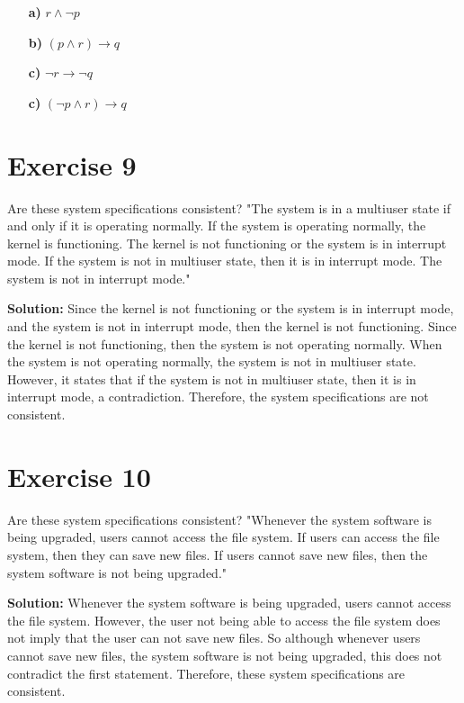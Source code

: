 \documentclass{Axon}
\begin{document}
\noindent
\begin{enumerate}
    \item[\textbf{a)}] \(r \land \lnot p\)
    \item[\textbf{b)}] \((p \land r) \to q\)
    \item[\textbf{c)}] \(\lnot r \to \lnot q\)
    \item[\textbf{c)}] \((\lnot p \land r) \to q\)
\end{enumerate}

\section*{Exercise 9}
Are these system specifications consistent? "The system is in a multiuser state if and only if it is operating normally. If the system is operating normally, the kernel is functioning. The kernel is not functioning or the system is in interrupt mode. If the system is not in multiuser state, then it is in interrupt mode. The system is not in interrupt mode."

\noindent
\textbf{Solution:}
Since the kernel is not functioning or the system is in interrupt mode, and the system is not in interrupt mode, then the kernel is not functioning. Since the kernel is not functioning, then the system is not operating normally. When the system is not operating normally, the system is not in multiuser state. However, it states that if the system is not in multiuser state, then it is in interrupt mode, a contradiction. Therefore, the system specifications are not consistent.

\section*{Exercise 10}
Are these system specifications consistent? "Whenever the system software is being upgraded, users cannot access the file system. If users can access the file system, then they can save new files. If users cannot save new files, then the system software is not being upgraded."

\noindent
\textbf{Solution:}
Whenever the system software is being upgraded, users cannot access the file system. However, the user not being able to access the file system does not imply that the user can not save new files. So although whenever users cannot save new files, the system software is not being upgraded, this does not contradict the first statement. Therefore, these system specifications are consistent.
\end{document}
